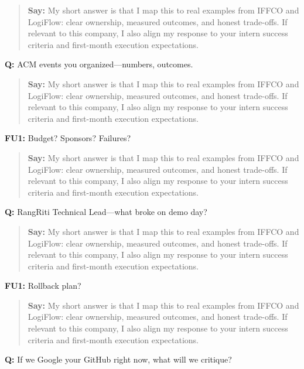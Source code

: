 \documentclass[9pt,a4paper]{article}
\begin{document}
\begin{quote}\small\textbf{Say:} My short answer is that I map this to real examples from IFFCO and LogiFlow: clear ownership, measured outcomes, and honest trade-offs. If relevant to this company, I also align my response to your intern success criteria and first-month execution expectations.\end{quote}
\vspace{2mm}
\textbf{Q:} ACM events you organized---numbers, outcomes.

\begin{quote}\small\textbf{Say:} My short answer is that I map this to real examples from IFFCO and LogiFlow: clear ownership, measured outcomes, and honest trade-offs. If relevant to this company, I also align my response to your intern success criteria and first-month execution expectations.\end{quote}
\vspace{2mm}
\textbf{FU1:} Budget? Sponsors? Failures?

\begin{quote}\small\textbf{Say:} My short answer is that I map this to real examples from IFFCO and LogiFlow: clear ownership, measured outcomes, and honest trade-offs. If relevant to this company, I also align my response to your intern success criteria and first-month execution expectations.\end{quote}
\vspace{2mm}
\textbf{Q:} RangRiti Technical Lead---what broke on demo day?

\begin{quote}\small\textbf{Say:} My short answer is that I map this to real examples from IFFCO and LogiFlow: clear ownership, measured outcomes, and honest trade-offs. If relevant to this company, I also align my response to your intern success criteria and first-month execution expectations.\end{quote}
\vspace{2mm}
\textbf{FU1:} Rollback plan?

\begin{quote}\small\textbf{Say:} My short answer is that I map this to real examples from IFFCO and LogiFlow: clear ownership, measured outcomes, and honest trade-offs. If relevant to this company, I also align my response to your intern success criteria and first-month execution expectations.\end{quote}
\vspace{2mm}
\textbf{Q:} If we Google your GitHub right now, what will we critique?
\end{document}
